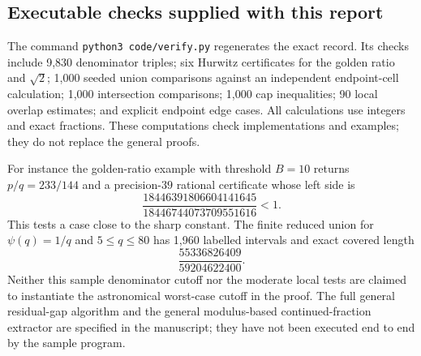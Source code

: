 \subsection{Executable checks supplied with this report}

The command \texttt{python3 code/verify.py} regenerates the exact
 record.  Its checks include 9,830 denominator
triples; six Hurwitz certificates for the golden ratio and $\sqrt2$;
1,000 seeded union comparisons against an independent endpoint-cell
calculation; 1,000 intersection comparisons; 1,000 cap inequalities;
90 local overlap estimates; and explicit endpoint edge cases.  All
calculations use integers and exact fractions.  These computations
check implementations and examples; they do not replace the general
proofs.

For instance the golden-ratio example with threshold $B=10$ returns
$p/q=233/144$ and a precision-$39$ rational certificate whose left side is
\[
 \frac{18446391806604141645}{18446744073709551616}<1.
\]
This tests a case close to the sharp constant.  The finite reduced union
for $\psi(q)=1/q$ and $5\le q\le80$ has 1,960 labelled intervals and
exact covered length
\[
 \frac{55336826409}{59204622400}.
\]
Neither this sample denominator cutoff nor the moderate local tests are
claimed to instantiate the astronomical worst-case cutoff in the proof.
The full general residual-gap algorithm and the general modulus-based
continued-fraction extractor are specified in the manuscript; they have
not been executed end to end by the sample program.
